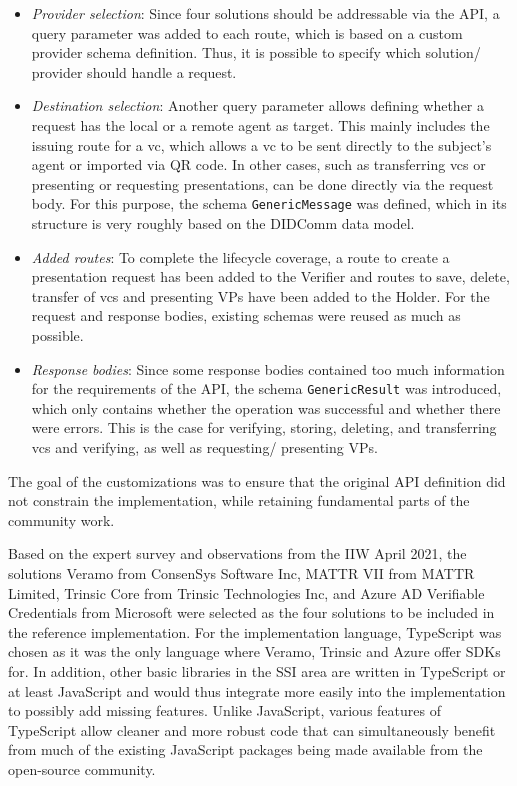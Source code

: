     \begin{itemize}
        \item \textit{Provider selection}: Since four solutions should be addressable via the API, a query parameter was added to each route, which is based on a custom provider schema definition. Thus, it is possible to specify which solution/ provider should handle a request.
        \item \textit{Destination selection}: Another query parameter allows defining whether a request has the local or a remote agent as target. This mainly includes the issuing route for a \ac{vc}, which allows a \ac{vc} to be sent directly to the subject's agent or imported via QR code. In other cases, such as transferring \acp{vc} or presenting or requesting presentations, can be done directly via the request body. For this purpose, the schema \texttt{GenericMessage} was defined, which in its structure is very roughly based on the DIDComm data model.
        \item \textit{Added routes}: To complete the lifecycle coverage, a route to create a presentation request has been added to the Verifier and routes to save, delete, transfer of \acp{vc} and presenting \acp{VP} have been added to the Holder. For the request and response bodies, existing schemas were reused as much as possible.
        \item \textit{Response bodies}: Since some response bodies contained too much information for the requirements of the API, the schema \texttt{GenericResult} was introduced, which only contains whether the operation was successful and whether there were errors. This is the case for verifying, storing, deleting, and transferring \acp{vc} and verifying, as well as requesting/ presenting \acp{VP}.
    \end{itemize}
    
    The goal of the customizations was to ensure that the original API definition did not constrain the implementation, while retaining fundamental parts of the community work. 
    
    Based on the expert survey and observations from the IIW April 2021, the solutions Veramo from ConsenSys Software Inc, MATTR VII from MATTR Limited, Trinsic Core from Trinsic Technologies Inc, and Azure AD Verifiable Credentials from Microsoft were selected as the four solutions to be included in the reference implementation. For the implementation language, TypeScript was chosen as it was the only language where Veramo, Trinsic and Azure offer SDKs for. In addition, other basic libraries in the \ac{SSI} area are written in TypeScript or at least JavaScript and would thus integrate more easily into the implementation to possibly add missing features. Unlike JavaScript, various features of TypeScript allow cleaner and more robust code \cite[p. 87]{zammetti_modern_2020} that can simultaneously benefit from much of the existing JavaScript packages being made available from the open-source community.
    
